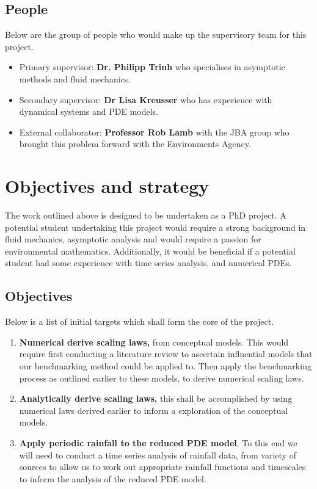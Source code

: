 \documentclass[11pt]{article}
\begin{document}
\vspace{5pt}
\subsection{People}
Below are the group of people who would make up the supervisory team for this project.
\begin{itemize}
    \item Primary supervisor: \textbf{Dr. Philipp Trinh} who specialises in asymptotic methods and fluid mechanics.
    \item Secondary supervisor: \textbf{Dr Lisa Kreusser} who has experience with dynamical systems and PDE models.
    \item External collaborator: \textbf{Professor Rob Lamb} with the JBA group who brought this problem forward with the Environments Agency.
\end{itemize}



\section{Objectives and strategy}

The work outlined above is designed to be undertaken as a PhD project. A potential student undertaking this project would require a strong background in fluid mechanics, asymptotic analysis and would require a passion for environmental mathematics. 
Additionally, it would be beneficial if a potential student had some experience with time series analysis, and numerical PDEs.

\subsection{Objectives}
Below is a list of initial targets which shall form the core of the project.

\begin{enumerate}
    \item \textbf{Numerical derive scaling laws,} from conceptual models. This would require first conducting a literature review to ascertain influential models that our benchmarking method could be applied to. Then apply the benchmarking process as outlined earlier to these models, to derive numerical scaling laws.
    \item \textbf{Analytically derive scaling laws,} this shall be accomplished by using numerical laws derived earlier to inform a exploration of the conceptual models.
    \item \textbf{Apply periodic rainfall to the reduced PDE model}. To this end we will need to conduct a time series analysis of rainfall data, from variety of sources to allow us to work out appropriate rainfall functions and timescales to inform the analysis of the reduced PDE model.
\end{enumerate}
\end{document}
